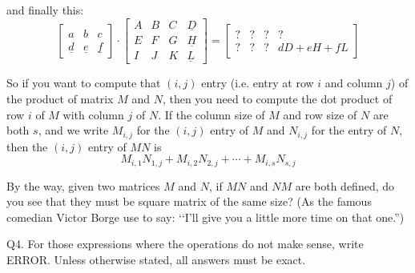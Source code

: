 and finally this:
\[
\begin{bmatrix}
a & b & c \\
\underline{d} & \underline{e} & \underline{f} 
\end{bmatrix}
\cdot
\begin{bmatrix}
A & B & C & \underline{D} \\
E & F & G & \underline{H} \\
I & J & K & \underline{L}  
\end{bmatrix}
= 
\begin{bmatrix}
? & ? & ? & ?\\
? & ? & ? & dD + eH + fL 
\end{bmatrix}
\]

So if you want to compute that $(i,j)$ entry 
(i.e. entry at row $i$ and column $j$) of the product of
matrix $M$ and $N$, then you need to compute the 
dot product of row $i$ of $M$ with column $j$ of $N$.
If the column size of $M$ and row size of $N$ are both $s$,
and we write $M_{i,j}$ for the $(i,j)$ entry of $M$ and
$N_{i,j}$ for the entry of $N$, then the 
$(i,j)$ entry of $MN$ is
\[
M_{i,1}N_{1,j} + 
M_{i,2}N_{2,j} + \cdots +
M_{i,s}N_{s,j} 
\]

By the way, given two matrices $M$ and $N$,
if $MN$ and $NM$ are both defined, do you see that they must be
square matrix of the same size? 
(As the famous comedian Victor Borge use to say:
\lq\lq I'll give you a little more time on that one.'')

\newpage



Q4.
For those expressions where the operations do not make sense,
write ERROR.
Unless otherwise stated, all answers must be exact.

